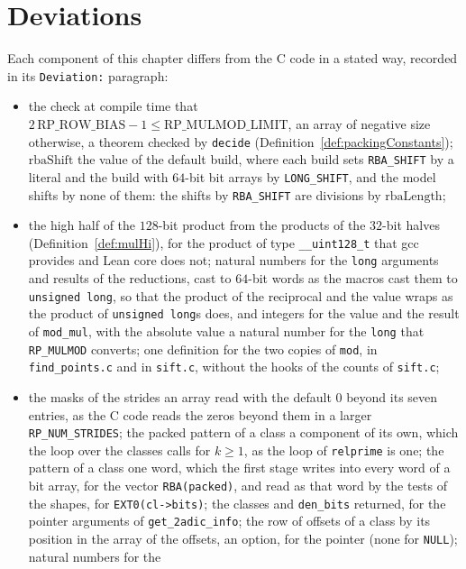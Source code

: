 \section{Deviations}\label{sec:packingDeviations}

Each component of this chapter differs from the C code in a stated way, recorded in its
\verb|Deviation:| paragraph:
\begin{itemize}
  \item the check at compile time that
    $2\,\mathrm{RP\_ROW\_BIAS} - 1 \le \mathrm{RP\_MULMOD\_LIMIT}$, an array of negative size
    otherwise, a theorem checked by \verb|decide| (Definition~\ref{def:packingConstants});
    $\mathrm{rbaShift}$ the value of the default build, where each build sets \verb|RBA_SHIFT| by a
    literal and the build with $64$-bit bit arrays by \verb|LONG_SHIFT|, and the model shifts by
    none of them: the shifts by \verb|RBA_SHIFT| are divisions by $\mathrm{rbaLength}$;
  \item the high half of the $128$-bit product from the products of the $32$-bit halves
    (Definition~\ref{def:mulHi}), for the product of type \verb|__uint128_t| that gcc provides and
    Lean core does not; natural numbers for the \verb|long| arguments and results of the reductions,
    cast to $64$-bit words as the macros cast them to \verb|unsigned long|, so that the product of
    the reciprocal and the value wraps as the product of \verb|unsigned long|s does, and integers
    for the value and the result of \verb|mod_mul|, with the absolute value a natural number for the
    \verb|long| that \verb|RP_MULMOD| converts; one definition for the two copies of \verb|mod|, in
    \verb|find_points.c| and in \verb|sift.c|, without the hooks of the counts of \verb|sift.c|;
  \item the masks of the strides an array read with the default $0$ beyond its seven entries, as the
    C code reads the zeros beyond them in a larger \verb|RP_NUM_STRIDES|; the packed pattern of a
    class a component of its own, which the loop over the classes calls for $k \ge 1$, as the loop
    of \verb|relprime| is one; the pattern of a class one word, which the first stage writes into
    every word of a bit array, for the vector \verb|RBA(packed)|, and read as that word by the tests
    of the shapes, for \verb|EXT0(cl->bits)|; the classes and \verb|den_bits| returned, for the
    pointer arguments of \verb|get_2adic_info|; the row of offsets of a class by its position in the
    array of the offsets, an option, for the pointer (none for \verb|NULL|); natural numbers for the

\end{itemize}
